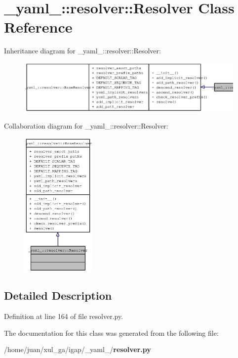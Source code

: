 \section{\_\-yaml\_\-::resolver::Resolver Class Reference}
\label{class__yaml___1_1resolver_1_1Resolver}
Inheritance diagram for \_\-yaml\_\-::resolver::Resolver:\nopagebreak
\begin{figure}[H]
\begin{center}
\leavevmode
\includegraphics[width=400pt]{class__yaml___1_1resolver_1_1Resolver__inherit__graph}
\end{center}
\end{figure}
Collaboration diagram for \_\-yaml\_\-::resolver::Resolver:\nopagebreak
\begin{figure}[H]
\begin{center}
\leavevmode
\includegraphics[width=105pt]{class__yaml___1_1resolver_1_1Resolver__coll__graph}
\end{center}
\end{figure}


\subsection{Detailed Description}


Definition at line 164 of file resolver.py.

The documentation for this class was generated from the following file:\begin{CompactItemize}
\item 
/home/juan/xul\_\-ga/igap/\_\-yaml\_\-/{\bf resolver.py}\end{CompactItemize}
